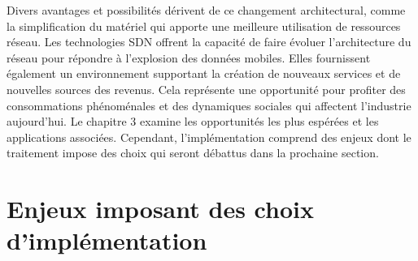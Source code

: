 


Divers avantages et possibilités dérivent de ce changement architectural, comme la simplification du matériel qui apporte une  meilleure utilisation de ressources réseau. Les technologies SDN offrent la capacité de faire évoluer l'architecture du réseau pour répondre à l'explosion des données mobiles. Elles fournissent également un environnement supportant la création de nouveaux services et  de nouvelles sources des revenus. Cela représente une opportunité pour profiter des consommations phénoménales et des dynamiques sociales qui affectent l'industrie aujourd'hui. \cite{IntelCloudEPC}
Le chapitre 3 examine les opportunités les plus espérées et les applications associées.  
Cependant, l'implémentation comprend des enjeux dont le traitement impose des choix qui seront débattus dans la prochaine section. 

\clearpage

\section{Enjeux imposant des choix d'implémentation}


